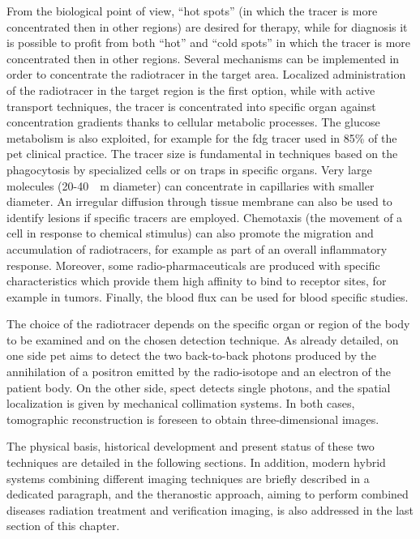 From the biological point of view, \enquote{hot spots} (in which the tracer is more concentrated then in other regions) are desired for therapy, while for diagnosis it is possible to profit from both \enquote{hot} and \enquote{cold spots} {in which the tracer is more concentrated then in other regions}. Several mechanisms can be implemented in order to concentrate the radiotracer in the target area. Localized administration of the radiotracer in the target region is the first option, while with active transport techniques, the tracer is concentrated into specific organ against concentration gradients thanks to cellular metabolic processes.  The glucose metabolism is also exploited, for example for the \gls{fdg} tracer used in 85\% of the \gls{pet} clinical practice. The tracer size is fundamental in techniques based on the phagocytosis by specialized cells or on traps in specific organs. Very large molecules (20-40~\charmu ~m diameter) can concentrate in capillaries with smaller diameter. An irregular diffusion through tissue membrane can also be used to identify lesions if specific tracers are employed. Chemotaxis (the movement of a cell in response to chemical stimulus) can also promote the migration and accumulation of radiotracers, for example as part of an overall inflammatory response. Moreover, some radio-pharmaceuticals are produced with specific characteristics which provide them high affinity to bind to receptor sites, for example in tumors. Finally, the blood flux can be used for blood specific studies. 

The choice of the radiotracer depends on the specific organ or region of the body to be examined and on the chosen detection technique. As already detailed, on one side \gls{pet} aims to detect the two back-to-back photons produced by the annihilation of a positron emitted by the radio-isotope and an electron of the patient body. On the other side, \gls{spect} detects single photons, and the spatial localization is given by mechanical collimation systems. In both cases, tomographic reconstruction is foreseen to obtain three-dimensional images.

The physical basis, historical development and present status of these two techniques are detailed in the following sections. In addition, modern hybrid systems combining different imaging techniques are briefly described in a dedicated paragraph, and the theranostic approach, aiming to perform combined  diseases radiation treatment and verification imaging, is also addressed in the last section of this chapter.  
 
